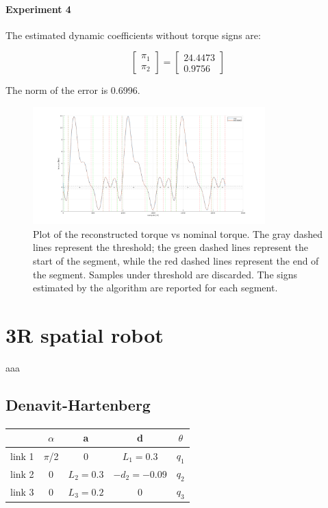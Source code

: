 \documentclass{article}
\begin{document}
\paragraph{Experiment 4} The estimated dynamic coefficients without torque signs are:

\[\begin{bmatrix}
\pi_1  \\ \pi_2 
\end{bmatrix}=\begin{bmatrix}
24.4473 \\ 0.9756
\end{bmatrix}\]

The norm of the error is 0.6996.
\begin{figure}[!htbp]
\centering
\includegraphics[width=0.8\textwidth]{images/1-dof/results_new_experiment4.png}
\caption{Plot of the reconstructed torque vs nominal torque. The gray dashed lines represent the threshold; the green dashed lines represent the start of the segment, while the red dashed lines represent the end of the segment. Samples under threshold are discarded. The signs estimated by the algorithm are reported for each segment.}
\end{figure}
\FloatBarrier
\section{3R spatial robot}
aaa
\subsection{Denavit-Hartenberg}
\paragraph{}
\FloatBarrier
\begin{table}[!htbp]
\centering
\begin{tabular}{|c|cccc|}
\hline
& $\alpha$ & a & d & $\theta$\\
\hline
link 1 & $\pi$/2 & 0 & $L_1=0.3$ & $q_1$\\
link 2 & 0 & $L_2=0.3$ & $-d_2=-0.09$ & $q_2$\\
link 3 & 0 & $L_3=0.2$ & 0 & $q_3$\\
\hline
\end{tabular}
\end{table}
\end{document}
